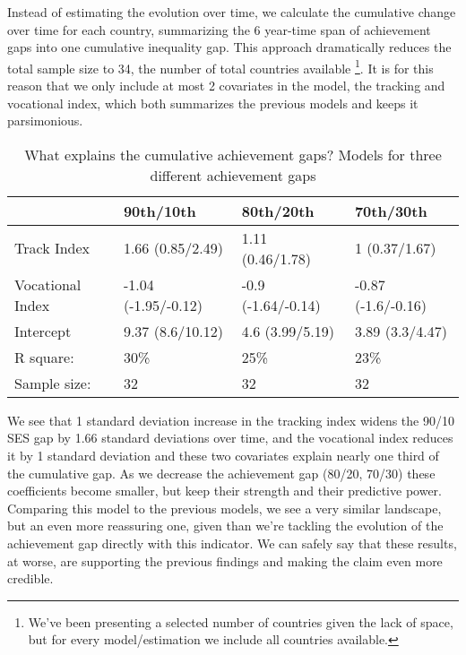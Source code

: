 \documentclass[11pt, a4paper]{article}\usepackage[]{graphicx}\usepackage[]{color}
\begin{document}
Instead of estimating the evolution over time, we calculate the cumulative change over time for each country, summarizing the 6 year-time span of achievement gaps into one cumulative inequality gap. This approach dramatically reduces the total sample size to 34, the number of total countries available \footnote{We've been presenting a selected number of countries given the lack of space, but for every model/estimation we include all countries available.}. It is for this reason that we only include at most 2 covariates in the model, the tracking and vocational index, which both summarizes the previous models and keeps it parsimonious.



\begin{table}[ht]
\centering
\begin{tabular}{llll}
  \hline
  & 90th/10th & 80th/20th & 70th/30th \\ 
  \hline
Track Index & 1.66 (0.85/2.49) & 1.11 (0.46/1.78) & 1 (0.37/1.67) \\ 
  Vocational Index & -1.04 (-1.95/-0.12) & -0.9 (-1.64/-0.14) & -0.87 (-1.6/-0.16) \\ 
  Intercept & 9.37 (8.6/10.12) & 4.6 (3.99/5.19) & 3.89 (3.3/4.47) \\ 
   \hline R square: & 30\% & 25\% & 23\% \\ Sample size: & 32 & 32 & 32 \\ \hline \hline
\end{tabular}
\caption{What explains the cumulative achievement gaps? Models for three different achievement gaps} 
\end{table}


We see that 1 standard deviation increase in the tracking index widens the 90/10 SES gap by 1.66 standard deviations over time, and the vocational index reduces it by 1 standard deviation and these two covariates explain nearly one third of the cumulative gap. As we decrease the achievement gap (80/20, 70/30) these coefficients become smaller, but keep their strength and their predictive power. Comparing this model to the previous models, we see a very similar landscape, but an even more reassuring one, given than we're tackling the evolution of the achievement gap directly with this indicator. We can safely say that these results, at worse, are supporting the previous findings and making the claim even more credible.
\end{document}
